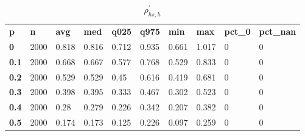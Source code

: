 \begin{table}[h]
 \centering 
\footnotesize
\caption{$\rho_{hs,h}^\prime $}
\label{tab:alphahsh}
\begin{tabular}[h]{| l l l l l l l l l l|
    } \hline
\textbf{ p} & \textbf{ n} & \textbf{ avg} & \textbf{ med} & \textbf{ q025} & \textbf{ q975} & \textbf{ min} & \textbf{ max} & \textbf{ pct\_0} & \textbf{ pct\_nan}
           \\
  \textbf{  0} & 2000 & 0.818 & 0.816 & 0.712 & 0.935 & 0.661 & 1.017 & 0 & 0
           \\
  \textbf{0.1} & 2000 & 0.668 & 0.667 & 0.577 & 0.768 & 0.529 & 0.833 & 0 & 0
           \\
  \textbf{0.2} & 2000 & 0.529 & 0.529 &  0.45 & 0.616 & 0.419 & 0.681 & 0 & 0
           \\
  \textbf{0.3} & 2000 & 0.398 & 0.395 & 0.333 & 0.467 & 0.302 & 0.523 & 0 & 0
           \\
  \textbf{0.4} & 2000 &  0.28 & 0.279 & 0.226 & 0.342 & 0.207 & 0.382 & 0 & 0
           \\
  \textbf{0.5} & 2000 & 0.174 & 0.173 & 0.125 & 0.226 & 0.097 & 0.259 & 0 & 0
           \\
 \hline \end{tabular}
 \end{table}
